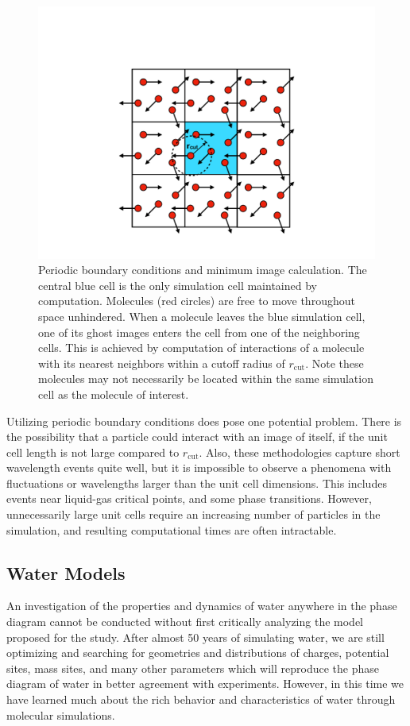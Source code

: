\begin{figure}
\includegraphics[width=\linewidth]{Figures/PBC}
\caption{\label{fig:PBC} Periodic boundary conditions and minimum
  image calculation. The central blue cell is the only simulation cell
  maintained by computation. Molecules (red circles) are free to move
  throughout space unhindered. When a molecule leaves the blue
  simulation cell, one of its ghost images enters the cell from one of
  the neighboring cells. This is achieved by computation of
  interactions of a molecule with its nearest neighbors within a
  cutoff radius of $r_{\mathrm{cut}}$. Note these molecules may not
  necessarily be located within the same simulation cell as the
  molecule of interest.}
\end{figure}

Utilizing periodic boundary conditions does pose one potential
problem. There is the possibility that a particle could interact with
an image of itself, if the unit cell length is not large compared to
$r_{\mathrm{cut}}$. Also, these methodologies capture short wavelength
events quite well, but it is impossible to observe a phenomena with
fluctuations or wavelengths larger than the unit cell dimensions. This
includes events near liquid-gas critical points, and some phase
transitions. However, unnecessarily large unit cells require an
increasing number of particles in the simulation, and resulting
computational times are often intractable.



\subsection{Water Models}\label{sec:WaterModels}
An investigation of the properties and dynamics of water anywhere in
the phase diagram cannot be conducted without first critically
analyzing the model proposed for the study. After almost 50 years of
simulating water, we are still optimizing and searching for geometries
and distributions of charges, potential sites, mass sites, and many
other parameters which will reproduce the phase diagram of water in
better agreement with experiments. However, in this time we have
learned much about the rich behavior and characteristics of water
through molecular simulations.

